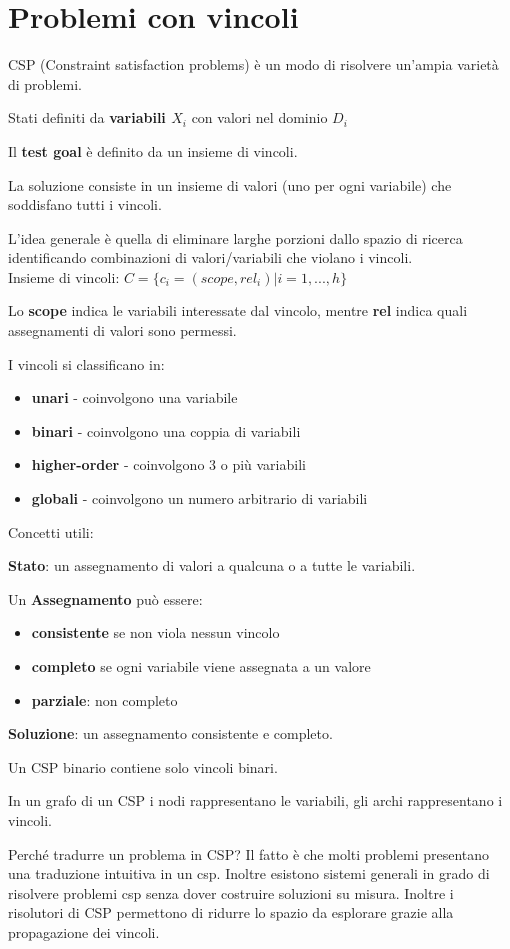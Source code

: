 \newpage

\section{Problemi con vincoli}

CSP (Constraint satisfaction problems) è un modo di risolvere un'ampia varietà di problemi.

Stati definiti da \textbf{ variabili $X_i$ } con valori nel dominio $D_i$

Il \textbf{test goal} è definito da un insieme di vincoli.

La {soluzione} consiste in un insieme di valori (uno per ogni variabile) che
soddisfano tutti i vincoli.

L'idea generale è quella di eliminare larghe porzioni dallo spazio di ricerca
identificando combinazioni di valori/variabili che violano i vincoli.\\

Insieme di vincoli: $C = \{ c_i = (scope,rel_i) | i=1,...,h\}$

Lo \textbf{scope} indica le variabili interessate dal vincolo, mentre \textbf{rel}
indica quali assegnamenti di valori sono permessi.

I vincoli si classificano in:

\begin{itemize}
 \item \textbf{unari} - coinvolgono una variabile
 \item \textbf{binari} - coinvolgono una coppia di variabili
 \item \textbf{higher-order} - coinvolgono 3 o più variabili
 \item \textbf{globali} - coinvolgono un numero arbitrario di variabili
\end{itemize}

Concetti utili:

\textbf{Stato}: un assegnamento di valori a qualcuna o a tutte le variabili.

Un \textbf{Assegnamento} può essere:

\begin{itemize}
 \item \textbf{consistente} se non viola nessun vincolo
 \item \textbf{completo} se ogni variabile viene assegnata a un valore
 \item \textbf{parziale}: non completo
\end{itemize}

\textbf{Soluzione}: un assegnamento consistente e completo.

Un CSP binario contiene solo vincoli binari.

In un grafo di un CSP i nodi rappresentano le variabili, gli archi rappresentano
i vincoli.

Perché tradurre un problema in CSP? Il fatto è che molti problemi presentano
una traduzione intuitiva in un csp. Inoltre esistono sistemi generali in grado di
risolvere problemi csp senza dover costruire soluzioni su misura.
Inoltre i risolutori di CSP permettono di ridurre lo spazio da esplorare grazie
alla propagazione dei vincoli.

